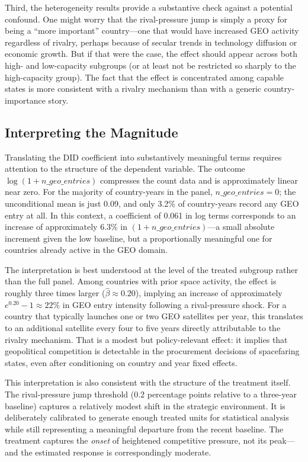 \documentclass[11pt]{article}
\begin{document}
Third, the heterogeneity results provide a substantive check against a potential confound. One might worry that the rival-pressure jump is simply a proxy for being a ``more important'' country---one that would have increased GEO activity regardless of rivalry, perhaps because of secular trends in technology diffusion or economic growth. But if that were the case, the effect should appear across both high- and low-capacity subgroups (or at least not be restricted so sharply to the high-capacity group). The fact that the effect is concentrated among capable states is more consistent with a rivalry mechanism than with a generic country-importance story.


\subsection{Interpreting the Magnitude}

Translating the DID coefficient into substantively meaningful terms requires attention to the structure of the dependent variable. The outcome $\log(1+n\_geo\_entries)$ compresses the count data and is approximately linear near zero. For the majority of country-years in the panel, $n\_geo\_entries = 0$; the unconditional mean is just 0.09, and only 3.2\% of country-years record any GEO entry at all. In this context, a coefficient of 0.061 in log terms corresponds to an increase of approximately 6.3\% in $(1+n\_geo\_entries)$---a small absolute increment given the low baseline, but a proportionally meaningful one for countries already active in the GEO domain.

The interpretation is best understood at the level of the treated subgroup rather than the full panel. Among countries with prior space activity, the effect is roughly three times larger ($\hat{\beta} \approx 0.20$), implying an increase of approximately $e^{0.20}-1 \approx 22\%$ in GEO entry intensity following a rival-pressure shock. For a country that typically launches one or two GEO satellites per year, this translates to an additional satellite every four to five years directly attributable to the rivalry mechanism. That is a modest but policy-relevant effect: it implies that geopolitical competition is detectable in the procurement decisions of spacefaring states, even after conditioning on country and year fixed effects.

This interpretation is also consistent with the structure of the treatment itself. The rival-pressure jump threshold (0.2 percentage points relative to a three-year baseline) captures a relatively modest shift in the strategic environment. It is deliberately calibrated to generate enough treated units for statistical analysis while still representing a meaningful departure from the recent baseline. The treatment captures the \emph{onset} of heightened competitive pressure, not its peak---and the estimated response is correspondingly moderate.
\end{document}
